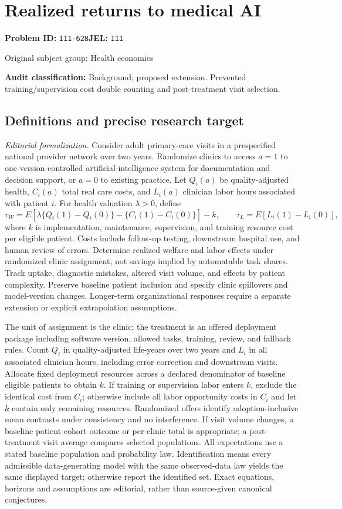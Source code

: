 \documentclass[11pt,a4paper]{article}
\begin{document}
\section*{Realized returns to medical AI}
\textbf{Problem ID:} \texttt{I11-628}\quad \textbf{JEL:} \texttt{I11}\par
\label{problem:OP-0447}
{\sffamily\small\color{muted}Original subject group: Health economics\par}
\label{definitions:problem:30007729}
\textbf{Audit classification:} Background; proposed extension. Prevented training/supervision cost double counting and post-treatment visit selection.
\subsection*{Definitions and precise research target}
\textit{Editorial formalization.} Consider adult primary-care visits in a prespecified national provider network over two years. Randomize clinics to access \(a=1\) to one version-controlled artificial-intelligence system for documentation and decision support, or \(a=0\) to existing practice. Let \(Q_i(a)\) be quality-adjusted health, \(C_i(a)\) total real care costs, and \(L_i(a)\) clinician labor hours associated with patient \(i\). For health valuation \(\lambda>0\), define
\[\tau_W=E[\lambda\{Q_i(1)-Q_i(0)\}-\{C_i(1)-C_i(0)\}]-k,\qquad\tau_L=E[L_i(1)-L_i(0)],\]
where \(k\) is implementation, maintenance, supervision, and training resource cost per eligible patient. Costs include follow-up testing, downstream hospital use, and human review of errors. Determine realized welfare and labor effects under randomized clinic assignment, not savings implied by automatable task shares. Track uptake, diagnostic mistakes, altered visit volume, and effects by patient complexity. Preserve baseline patient inclusion and specify clinic spillovers and model-version changes. Longer-term organizational responses require a separate extension or explicit extrapolation assumptions.

The unit of assignment is the clinic; the treatment is an offered deployment package including software version, allowed tasks, training, review, and fallback rules. Count \(Q_i\) in quality-adjusted life-years over two years and \(L_i\) in all associated clinician hours, including error correction and downstream visits. Allocate fixed deployment resources across a declared denominator of baseline eligible patients to obtain \(k\). If training or supervision labor enters \(k\), exclude the identical cost from \(C_i\); otherwise include all labor opportunity costs in \(C_i\) and let \(k\) contain only remaining resources. Randomized offers identify adoption-inclusive mean contrasts under consistency and no interference. If visit volume changes, a baseline patient-cohort outcome or per-clinic total is appropriate; a post-treatment visit average compares selected populations. All expectations use a stated baseline population and probability law. Identification means every admissible data-generating model with the same observed-data law yields the same displayed target; otherwise report the identified set. Exact equations, horizons and assumptions are editorial, rather than source-given canonical conjectures.
\end{document}
